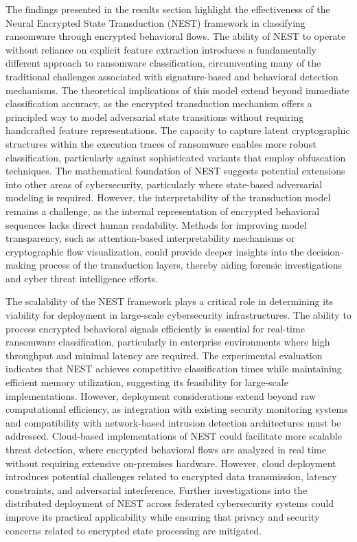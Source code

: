 \documentclass[lettersize,journal]{IEEEtran}
\begin{document}
The findings presented in the results section highlight the effectiveness of the Neural Encrypted State Transduction (NEST) framework in classifying ransomware through encrypted behavioral flows. The ability of NEST to operate without reliance on explicit feature extraction introduces a fundamentally different approach to ransomware classification, circumventing many of the traditional challenges associated with signature-based and behavioral detection mechanisms. The theoretical implications of this model extend beyond immediate classification accuracy, as the encrypted transduction mechanism offers a principled way to model adversarial state transitions without requiring handcrafted feature representations. The capacity to capture latent cryptographic structures within the execution traces of ransomware enables more robust classification, particularly against sophisticated variants that employ obfuscation techniques. The mathematical foundation of NEST suggests potential extensions into other areas of cybersecurity, particularly where state-based adversarial modeling is required. However, the interpretability of the transduction model remains a challenge, as the internal representation of encrypted behavioral sequences lacks direct human readability. Methods for improving model transparency, such as attention-based interpretability mechanisms or cryptographic flow visualization, could provide deeper insights into the decision-making process of the transduction layers, thereby aiding forensic investigations and cyber threat intelligence efforts.

The scalability of the NEST framework plays a critical role in determining its viability for deployment in large-scale cybersecurity infrastructures. The ability to process encrypted behavioral signals efficiently is essential for real-time ransomware classification, particularly in enterprise environments where high throughput and minimal latency are required. The experimental evaluation indicates that NEST achieves competitive classification times while maintaining efficient memory utilization, suggesting its feasibility for large-scale implementations. However, deployment considerations extend beyond raw computational efficiency, as integration with existing security monitoring systems and compatibility with network-based intrusion detection architectures must be addressed. Cloud-based implementations of NEST could facilitate more scalable threat detection, where encrypted behavioral flows are analyzed in real time without requiring extensive on-premises hardware. However, cloud deployment introduces potential challenges related to encrypted data transmission, latency constraints, and adversarial interference. Further investigations into the distributed deployment of NEST across federated cybersecurity systems could improve its practical applicability while ensuring that privacy and security concerns related to encrypted state processing are mitigated.
\end{document}
